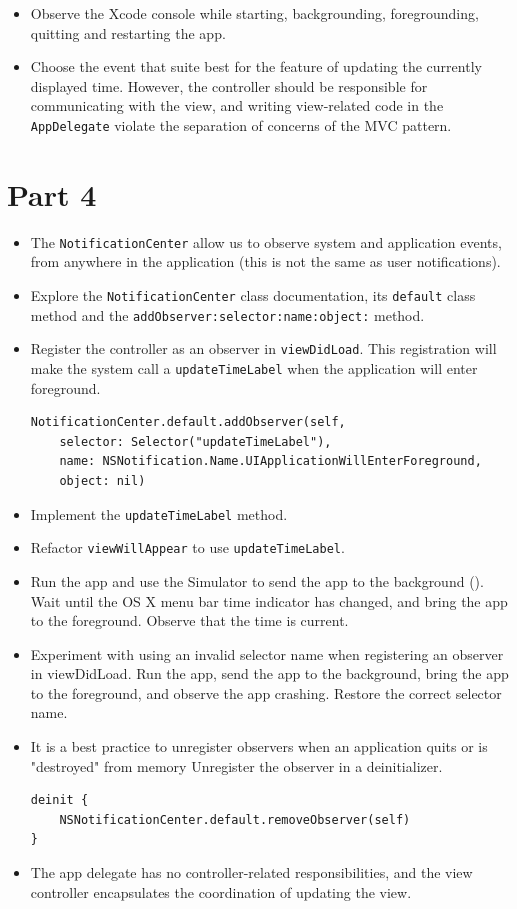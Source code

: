 \documentclass[a4paper,11pt]{scrartcl}
\begin{document}
\begin{itemize}
\begin{figure}[h]
\begin{center}
	\end{center}
\end{figure}
\item Observe the Xcode console while starting, backgrounding, foregrounding, quitting and restarting the app.
\item Choose the event that suite best for the feature of updating the currently displayed time. However, the controller should be responsible for communicating with the view, and writing view-related code in the \texttt{AppDelegate} violate the separation of concerns of the MVC pattern.
\end{itemize}

\section*{Part 4}

\begin{itemize}
\item The \texttt{NotificationCenter} allow us to observe system and application events, from anywhere in the application (this is not the same as user notifications).
\item Explore the \texttt{NotificationCenter} class documentation, its \texttt{default} class method and the \texttt{addObserver:selector:name:object:} method.
\item Register the controller as an observer in \texttt{viewDidLoad}. This registration will make the system call a \texttt{updateTimeLabel} when the application will enter foreground.
\begin{lstlisting}
NotificationCenter.default.addObserver(self, 
	selector: Selector("updateTimeLabel"), 
	name: NSNotification.Name.UIApplicationWillEnterForeground, 
	object: nil)
\end{lstlisting}
\item Implement the \texttt{updateTimeLabel} method.
\item Refactor \texttt{viewWillAppear} to use \texttt{updateTimeLabel}.
\item Run the app and use the Simulator to send the app to the background (). Wait until the OS X menu bar time indicator has changed, and bring the app to the foreground. Observe that the time is current.
\item Experiment with using an invalid selector name when registering an observer in viewDidLoad. Run the app, send the app to the background, bring the app to the foreground, and observe the app crashing. Restore the correct selector name.
\item It is a best practice to unregister observers when an application quits or is "destroyed" from memory Unregister the observer in a deinitializer.
\begin{lstlisting}
deinit {
	NSNotificationCenter.default.removeObserver(self)
}
\end{lstlisting}
\item The app delegate has no controller-related responsibilities, and the view controller encapsulates the coordination of updating the view.
\end{itemize}
\end{document}
